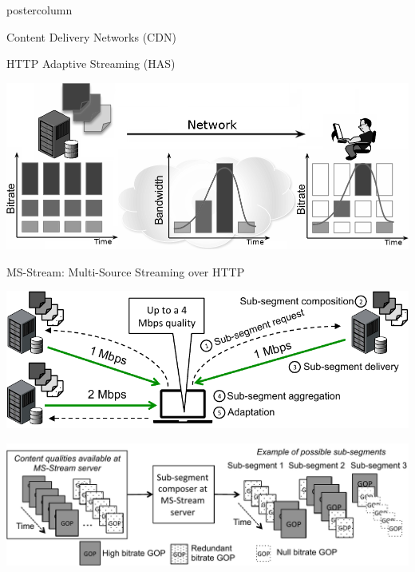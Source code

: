 \begin{frame}
\begin{columns}
\begin{column}{.49\textwidth}
\begin{beamercolorbox}[center,wd=\textwidth]{postercolumn}
\begin{minipage}[T]{.95\textwidth}
{\begin{block}{Content Delivery Networks (CDN)}
            \end{block}
            
            \vfill
            
            \begin{block}{HTTP Adaptive Streaming (HAS)}
            
            \centering
            
            \includegraphics[width=.925\textwidth]{sample/DASH-2.png}
            
            \end{block}
            
            \vfill
            
            \begin{block}{MS-Stream: Multi-Source Streaming over HTTP}
            
            \centering
            
            \includegraphics[width=.925\textwidth]{sample/msstream_archi.pdf}
            
            \includegraphics[width=.925\textwidth]{sample/chunk2.pdf}
            
            \end{block}
            
}
\end{minipage}
\end{beamercolorbox}
\end{column}
\end{columns}
\end{frame}
